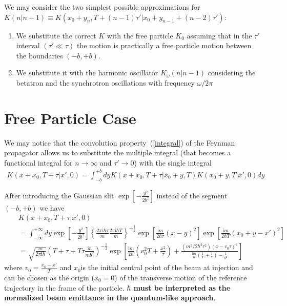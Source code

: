 \documentclass[]{article}
\begin{document}
We may consider the two simplest possible approximations for 
$K \left( n | n - 1 \right) \equiv 
K \left( x_0 + y_n , T + (n - 1) \tau ' | 
x_0 + y_{n - 1} + (n - 2) \tau ' \right)$:

\begin{enumerate}

\item
We substitute the correct $K$ with the free particle $K_0$ assuming that 
in the $\tau '$ interval $(\tau ' \ll \tau)$ the motion is practically a
free particle motion between the boundaries $( -b , + b )$.

\item
We substitute it with the harmonic oscillator 
$K_{\omega} \left( n | n -1 \right)$ considering the betatron and the 
synchrotron oscillations with frequency $\omega/{2 \pi}$

\end{enumerate}

\section{Free Particle Case}
We may notice that the convolution property~(\ref{integral}) of the
Feynman propagator allows us to substitute the multiple integral
(that becomes a functional integral for $n \longrightarrow \infty$ and 
$\tau ' \longrightarrow 0$) with the single integral
\begin{eqnarray}
K \left( x + x_0 , T + \tau | x' , 0 \right) 
= \int_{- b}^{+ b} dy
K \left( x + x_0 , T + \tau | x_0 + y , T \right) 
K \left( x_0 + y , T | x' , 0 \right) dy
\label{single}
\end{eqnarray}
%

After introducing the Gaussian slit 
$\exp{\left[- \frac{y^2}{2 b^2}\right]}$ instead of the segment 
$\left( - b , + b \right)$ we have
\begin{eqnarray}
& & K \left(x + x_0 , T + \tau | x' , 0 \right) \nonumber \\
& & = 
\int_{-\infty}^{+\infty}  dy
\exp{\left[-\frac{y^2}{2 b^2} \right]} 
\left\{\frac{2 \pi \mathrm{i}\hbar \tau}{m} 
\frac{2 \pi \mathrm{i}\hbar T}{m} \right\}^{- \frac{1}{2}}
\exp{\left[\frac{\mathrm{i}m}{2 \hbar \tau} (x - y)^2\right]} 
\exp{\left[\frac{\mathrm{i}m}{2 \hbar T} (x_0 + y - x')^2\right]} \nonumber \\
& & = 
\sqrt{\frac{m}{2 \pi \mathrm{i}\hbar}}
\left(T + \tau + T \tau \frac{\mathrm{i}\hbar}{m b^2} \right)^{-\frac{1}{2}} 
\exp
\left[
\frac{\mathrm{i}m}{ 2 \hbar} \left(v_0^2 T + \frac{x^2}{\tau} \right)
+
\frac{\left(m^2/{2 \hbar^2 \tau^2}\right) \left(x - v_0 \tau \right)^2}
{\frac{\mathrm{i}m}{\hbar} \left(\frac{1}{T} + \frac{1}{\tau} \right) 
- \frac{1}{b^2}}
\right]
\label{exp}
\end{eqnarray}
%
where $v_0 = \frac{x_0 - x'}{T}$ and $x_0$is the initial central point 
of the beam at injection and can be chosen as the origin ($x_0 = 0$) of
the transverse motion of the reference trajectory in the frame of the
particle. {\bf $\hbar$ must be interpreted as the 
normalized beam emittance in the quantum-like approach}.
\end{document}
